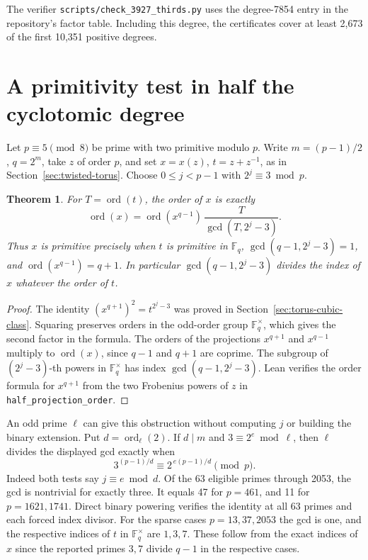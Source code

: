 \documentclass[11pt]{article}
\newtheorem{theorem}{Theorem}
\newcommand{\ord}{\operatorname{ord}}
\begin{document}
The verifier \nolinkurl{scripts/check_3927_thirds.py} uses the
degree-7854 entry in the repository's factor table.
Including this degree, the certificates cover at least 2,673 of the
first 10,351 positive degrees.

\clearpage
\section{A primitivity test in half the cyclotomic degree}
\label{sec:twisted-half-order}

Let \(p\equiv5\pmod8\) be prime with two primitive modulo \(p\).
Write \(m=(p-1)/2\), \(q=2^m\), take \(z\) of order \(p\), and set
\(x=x(z)\), \(t=z+z^{-1}\), as in Section~\ref{sec:twisted-torus}.
Choose \(0\le j<p-1\) with \(2^j\equiv3\bmod p\).

\begin{theorem}
For \(T=\ord(t)\), the order of \(x\) is exactly
\[
          \ord(x)=\ord(x^{q-1})\,
                   \frac{T}{\gcd(T,2^j-3)} .
\]
Thus \(x\) is primitive precisely when \(t\) is primitive in
\(\mathbb F_q\), \(\gcd(q-1,2^j-3)=1\), and
\(\ord(x^{q-1})=q+1\). In particular \(\gcd(q-1,2^j-3)\) divides
the index of \(x\) whatever the order of \(t\).
\end{theorem}
\begin{proof}
The identity \((x^{q+1})^2=t^{2^j-3}\) was proved in
Section~\ref{sec:torus-cubic-class}. Squaring preserves orders in
the odd-order group \(\mathbb F_q^\times\), which gives the second
factor in the formula. The orders of the projections \(x^{q+1}\)
and \(x^{q-1}\) multiply to \(\ord(x)\), since \(q-1\) and \(q+1\)
are coprime. The subgroup of \((2^j-3)\)-th powers in
\(\mathbb F_q^\times\) has index \(\gcd(q-1,2^j-3)\).
Lean verifies the order formula for \(x^{q+1}\) from the two
Frobenius powers of \(z\) in \texttt{half\_projection\_order}.
\end{proof}

An odd prime \(\ell\) can give this obstruction without computing \(j\)
or building the binary extension. Put \(d=\ord_\ell(2)\). If
\(d\mid m\) and \(3\equiv2^e\bmod\ell\), then \(\ell\) divides
the displayed gcd exactly when
\[
          3^{(p-1)/d}\equiv2^{\,e(p-1)/d}\pmod p.
\]
Indeed both tests say \(j\equiv e\bmod d\).
Of the 63 eligible primes through 2053, the gcd is nontrivial for
exactly three. It equals 47 for \(p=461\), and 11 for \(p=1621,1741\).
Direct binary powering verifies the identity at all 63 primes and
each forced index divisor. For the sparse cases \(p=13,37,2053\)
the gcd is one, and the respective indices of \(t\) in
\(\mathbb F_q^\times\) are \(1,3,7\). These follow from the exact
indices of \(x\) since the reported primes \(3,7\) divide \(q-1\)
in the respective cases.
\end{document}

